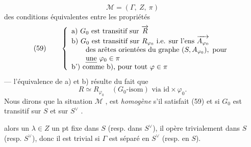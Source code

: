 \documentclass[11pt,a4paper]{article}
\begin{document}
  
\[
\mathcal{M} = (\Gamma,\ Z,\ \pi)
\]
\struck{\ill{}}  des conditions équivalentes entre les propriétés
\[
(59) \qquad
\left\{
\begin{array}{l}
\text{a) } G_0 \text{ est transitif sur } \overrightarrow{R} \\
\text{b) } G_0 \text{ est transitif sur } R_{\varphi_0} \text{ i.e. sur l'ens } \overrightarrow{A_{\varphi_0}} \\
\qquad \text{des arêtes orientées du graphe } (S, A_{\varphi_0}), \text{ pour} \\
\qquad \text{\emph{une} } \varphi_0 \in \pi \\
\text{b') comme b), pour tout } \varphi \in \pi
\end{array}
\right.
\]
--- l'équivalence de a) et b) résulte du \struck{\ill{}} fait que
\[
R \simeq R_{\varphi_0} \quad (G_0\text{-isom}) \text{ via } \mathrm{id} \times \varphi_0 .
\]
Nous dirons que la situation  $\mathcal{M}$  ,  \add{\ill{}} est \emph{homogène} s'il satisfait (59) et si $G_0$ est transitif sur $S$ et sur $S^{\vee}$ .

\struck{\ill{}} alors un $\lambda \in Z$ \struck{\ill{}}  un pt fixe dans $S$ (resp. dans $S^{\vee}$), il opère trivialement dans $S$ (resp. $S^{\vee}$), donc il est trivial si $\Gamma$ est séparé en $S^{\vee}$ (resp. en $S$).
\end{document}
